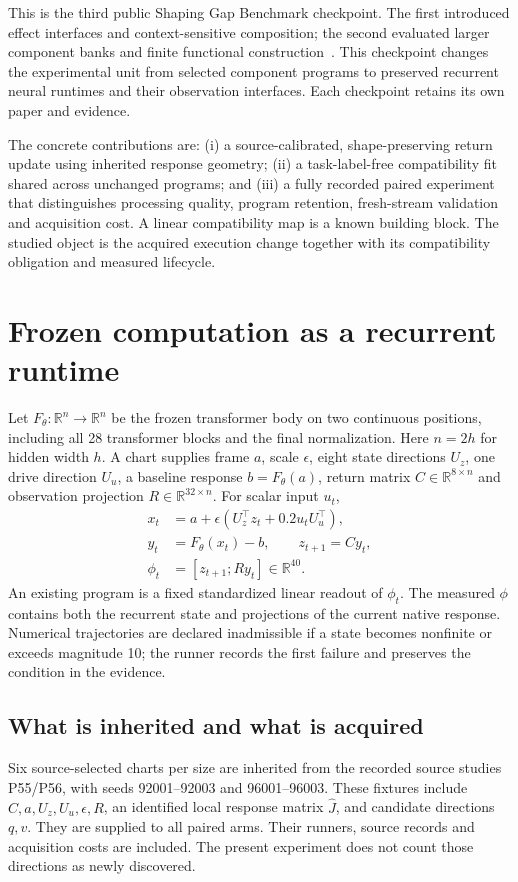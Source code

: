 \documentclass[11pt]{article}
\begin{document}
This is the third public Shaping Gap Benchmark checkpoint. The first introduced effect interfaces and context-sensitive composition; the second evaluated larger component banks and finite functional construction~\cite{sg1,sg2}. This checkpoint changes the experimental unit from selected component programs to preserved recurrent neural runtimes and their observation interfaces. Each checkpoint retains its own paper and evidence.

The concrete contributions are: (i) a source-calibrated, shape-preserving return update using inherited response geometry; (ii) a task-label-free compatibility fit shared across unchanged programs; and (iii) a fully recorded paired experiment that distinguishes processing quality, program retention, fresh-stream validation and acquisition cost. A linear compatibility map is a known building block. The studied object is the acquired execution change together with its compatibility obligation and measured lifecycle.

\section{Frozen computation as a recurrent runtime}
Let $F_\theta:\mathbb R^n\to\mathbb R^n$ be the frozen transformer body on two continuous positions, including all 28 transformer blocks and the final normalization. Here $n=2h$ for hidden width $h$. A chart supplies frame $a$, scale $\epsilon$, eight state directions $U_z$, one drive direction $U_u$, a baseline response $b=F_\theta(a)$, return matrix $C\in\mathbb R^{8\times n}$ and observation projection $R\in\mathbb R^{32\times n}$. For scalar input $u_t$,
\begin{align}
 x_t &= a+\epsilon(U_z^\top z_t+0.2u_tU_u^\top),\\
 y_t &= F_\theta(x_t)-b,\qquad z_{t+1}=Cy_t,\\
 \phi_t &= [z_{t+1};Ry_t]\in\mathbb R^{40}.
\end{align}
An existing program is a fixed standardized linear readout of $\phi_t$. The measured $\phi$ contains both the recurrent state and projections of the current native response. Numerical trajectories are declared inadmissible if a state becomes nonfinite or exceeds magnitude 10; the runner records the first failure and preserves the condition in the evidence.

\subsection{What is inherited and what is acquired}
Six source-selected charts per size are inherited from the recorded source studies P55/P56, with seeds 92001--92003 and 96001--96003. These fixtures include $C,a,U_z,U_u,\epsilon,R$, an identified local response matrix $\widehat J$, and candidate directions $q,v$. They are supplied to all paired arms. Their runners, source records and acquisition costs are included. The present experiment does not count those directions as newly discovered.
\end{document}
